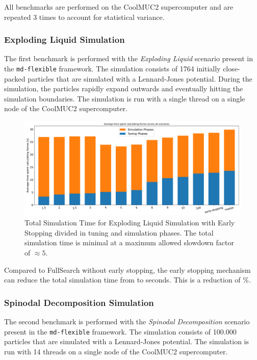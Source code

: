 \documentclass[conference]{IEEEtran}
\begin{document}
All benchmarks are performed on the CoolMUC2 supercomputer  and are repeated 3 times to account for statistical variance.

\subsubsection{Exploding Liquid Simulation}

The first benchmark is performed with the \textit{Exploding Liquid} scenario present in the \texttt{md-flexible} framework. The simulation consists of 1764 initially close-packed particles that are simulated with a Lennard-Jones potential. During the simulation, the particles rapidly expand outwards and eventually hitting the simulation boundaries. The simulation is run with a single thread on a single node of the CoolMUC2 supercomputer.

\begin{figure}[H]
    \centering

    \includegraphics[width=\columnwidth]{../data/explodingLiquid/analytics/total_time_average.png}

    \caption{Total Simulation Time for Exploding Liquid Simulation with Early Stopping divided in tuning and simulation phases. The total simulation time is minimal at a maximum allowed slowdown factor of $\approx5$.}
\end{figure}

Compared to FullSearch without early stopping, the early stopping mechanism can reduce the total simulation time from  to  seconds. This is a reduction of \%.

\subsubsection{Spinodal Decomposition Simulation}

The second benchmark is performed with the \textit{Spinodal Decomposition} scenario present in the \texttt{md-flexible} framework. The simulation consists of 100.000 particles that are simulated with a Lennard-Jones potential. The simulation is run with 14 threads on a single node of the CoolMUC2 supercomputer.
\end{document}
